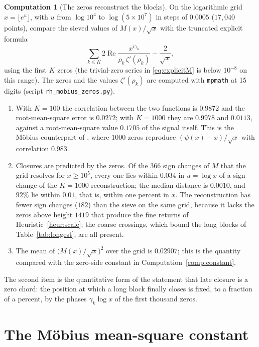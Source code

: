 \documentclass[11pt]{article}
\theoremstyle{definition}
\newtheorem{computation}[theorem]{Computation}
\theoremstyle{remark}
\DeclareMathOperator{\Ree}{Re}
\begin{document}
\begin{computation}[The zeros reconstruct the blocks]\label{comp:recon}
On the logarithmic grid $x=\lfloor e^u\rfloor$, with $u$ from $\log10^4$ to $\log(5\times10^7)$ in steps of $0.0005$ ($17{,}040$ points), compare the sieved values of $M(x)/\sqrt x$ with the truncated explicit formula
\[
\sum_{k\le K}2\Ree\frac{x^{i\gamma_k}}{\rho_k\,\zeta'(\rho_k)}-\frac{2}{\sqrt x},
\]
using the first $K$ zeros (the trivial-zero series in \eqref{eq:explicitM} is below $10^{-8}$ on this range). The zeros and the values $\zeta'(\rho_k)$ are computed with \texttt{mpmath} at 15 digits (script \texttt{rh\_mobius\_zeros.py}).
\begin{enumerate}[label=(\arabic*)]
\item With $K=100$ the correlation between the two functions is $0.9872$ and the root-mean-square error is $0.0272$; with $K=1000$ they are $0.9978$ and $0.0113$, against a root-mean-square value $0.1705$ of the signal itself. This is the M\"obius counterpart of \cite[Computation 13.3(3)]{michaels-folds}, where $1000$ zeros reproduce $(\psi(x)-x)/\sqrt x$ with correlation $0.983$.
\item Closures are predicted by the zeros. Of the $366$ sign changes of $M$ that the grid resolves for $x\ge10^5$, every one lies within $0.034$ in $u=\log x$ of a sign change of the $K=1000$ reconstruction; the median distance is $0.0010$, and $92\%$ lie within $0.01$, that is, within one percent in $x$. The reconstruction has fewer sign changes ($182$) than the sieve on the same grid, because it lacks the zeros above height $1419$ that produce the fine returns of Heuristic~\ref{heur:scale}; the coarse crossings, which bound the long blocks of Table~\ref{tab:longest}, are all present.
\item The mean of $\big(M(x)/\sqrt x\big)^2$ over the grid is $0.02907$; this is the quantity compared with the zero-side constant in Computation~\ref{comp:constant}.
\end{enumerate}
\end{computation}

The second item is the quantitative form of the statement that late closure is a zero chord: the position at which a long block finally closes is fixed, to a fraction of a percent, by the phases $\gamma_k\log x$ of the first thousand zeros.

\section{The M\"obius mean-square constant}\label{sec:constant}
\end{document}
